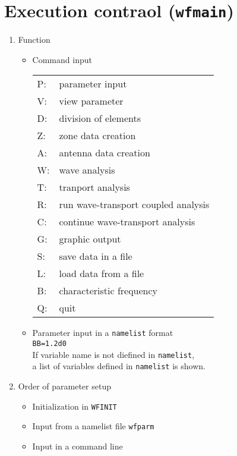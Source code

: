 \section{Execution contraol ({\tt wfmain})}
\begin{enumerate}
\item
Function
\begin{itemize}
\item
Command input

\qquad
\begin{tabular}{ll}
P:& parameter input \\
V:& view parameter \\
D:& division of elements \\
Z:& zone data creation \\
A:& antenna data creation \\
W:& wave analysis \\
T:& tranport analysis \\
R:& run wave-transport coupled analysis \\
C:& continue wave-transport analysis \\
G:& graphic output \\
S:& save data in a file \\
L:& load data from a file \\
B:& characteristic frequency \\
Q:& quit
\end{tabular}
\item
Parameter input in a {\tt namelist} format
\\\qquad \verb/BB=1.2d0/
\\\qquad If variable name is not diefined in {\tt namelist},
\\\qquad a list of variables defined in {\tt namelist} is shown.
\end{itemize}

\item
Order of parameter setup
\begin{itemize}
\item
Initialization in {\tt WFINIT}
\item
Input from a namelist file {\tt wfparm}
\item
Input in a command line
\end{itemize}
\end{enumerate}
